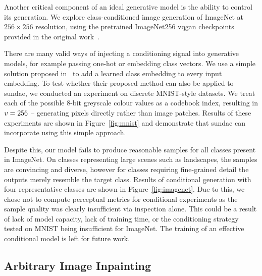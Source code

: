 Another critical component of an ideal generative model is the ability to
control its generation. We explore class-conditioned image generation of
ImageNet at $256 \times 256$ resolution, using the pretrained ImageNet256
\gls{vqgan} checkpoints provided in the original work~\cite{esser2021taming}. 

There are many valid ways of injecting a conditioning signal into generative
models, for example passing one-hot or embedding class vectors. We use a simple
solution proposed in~\cite{parmar2018image} to add a learned class embedding to
every input embedding. To test whether their proposed method can also be applied
to \gls{sundae}, we conducted an experiment on discrete MNIST-style datasets. We
treat each of the possible 8-bit greyscale colour values as a codebook
index, resulting in $v = 256$ -- generating pixels directly rather
than image patches. Results of these experiments are shown in
Figure~\ref{fig:mnist} and demonstrate that \gls{sundae} can incorporate using
this simple approach.

Despite this, our model fails to produce reasonable samples for all classes
present in ImageNet. On classes representing large scenes such as landscapes,
the samples are convincing and diverse, however for classes requiring
fine-grained detail the outputs merely resemble the target class. Results of
conditional generation with four representative classes are shown in
Figure~\ref{fig:imagenet}. Due to this, we chose not to compute perceptual
metrics for conditional experiments as the sample quality was clearly
insufficient via inspection alone. This could be a result of lack of model
capacity, lack of training time, or the conditioning strategy tested on MNIST
being insufficient for ImageNet. The training of an effective conditional model
is left for future work.

\subsection{Arbitrary Image Inpainting}
\label{subsec:evaluationInpainting}

